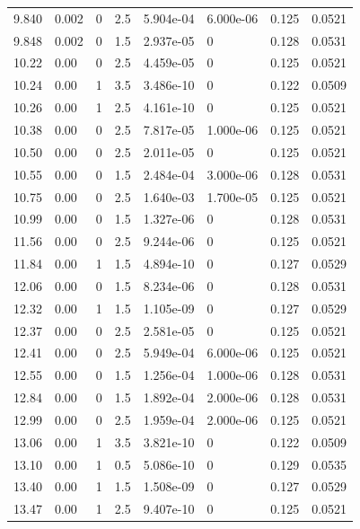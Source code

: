 \documentclass[preview]{standalone}
\begin{document}
{{{\begin{tabular}{L{1.2cm}C{1.2cm} C{0.3cm}C{0.5cm} C{1.4cm}C{1.4cm} C{1.4cm}C{1.4cm}}
  9.840  &  0.002  & 0     & 2.5 &  5.904e-04  & 6.000e-06  & 0.125 &  0.0521   \\ 
  9.848  &  0.002  & 0     & 1.5 &  2.937e-05  & 0  & 0.128 &  0.0531   \\ 
  10.22  &  0.00  & 0     & 2.5 &  4.459e-05  & 0  & 0.125 &  0.0521   \\ 
  10.24  &  0.00  & 1     & 3.5 &  3.486e-10  & 0  & 0.122 &  0.0509   \\ 
  10.26  &  0.00  & 1     & 2.5 &  4.161e-10  & 0  & 0.125 &  0.0521   \\ 
  10.38  &  0.00  & 0     & 2.5 &  7.817e-05  & 1.000e-06  & 0.125 &  0.0521   \\ 
  10.50  &  0.00  & 0     & 2.5 &  2.011e-05  & 0  & 0.125 &  0.0521   \\ 
  10.55  &  0.00  & 0     & 1.5 &  2.484e-04  & 3.000e-06  & 0.128 &  0.0531   \\ 
  10.75  &  0.00  & 0     & 2.5 &  1.640e-03  & 1.700e-05  & 0.125 &  0.0521   \\ 
  10.99  &  0.00  & 0     & 1.5 &  1.327e-06  & 0  & 0.128 &  0.0531   \\ 
  11.56  &  0.00  & 0     & 2.5 &  9.244e-06  & 0  & 0.125 &  0.0521   \\ 
  11.84  &  0.00  & 1     & 1.5 &  4.894e-10  & 0  & 0.127 &  0.0529   \\ 
  12.06  &  0.00  & 0     & 1.5 &  8.234e-06  & 0  & 0.128 &  0.0531   \\ 
  12.32  &  0.00  & 1     & 1.5 &  1.105e-09  & 0  & 0.127 &  0.0529   \\ 
  12.37  &  0.00  & 0     & 2.5 &  2.581e-05  & 0  & 0.125 &  0.0521   \\ 
  12.41  &  0.00  & 0     & 2.5 &  5.949e-04  & 6.000e-06  & 0.125 &  0.0521   \\ 
  12.55  &  0.00  & 0     & 1.5 &  1.256e-04  & 1.000e-06  & 0.128 &  0.0531   \\ 
  12.84  &  0.00  & 0     & 1.5 &  1.892e-04  & 2.000e-06  & 0.128 &  0.0531   \\ 
  12.99  &  0.00  & 0     & 2.5 &  1.959e-04  & 2.000e-06  & 0.125 &  0.0521   \\ 
  13.06  &  0.00  & 1     & 3.5 &  3.821e-10  & 0  & 0.122 &  0.0509   \\ 
  13.10  &  0.00  & 1     & 0.5 &  5.086e-10  & 0  & 0.129 &  0.0535   \\ 
  13.40  &  0.00  & 1     & 1.5 &  1.508e-09  & 0  & 0.127 &  0.0529   \\ 
  13.47  &  0.00  & 1     & 2.5 &  9.407e-10  & 0  & 0.125 &  0.0521   \\ 

\end{tabular}}}}
\end{document}
